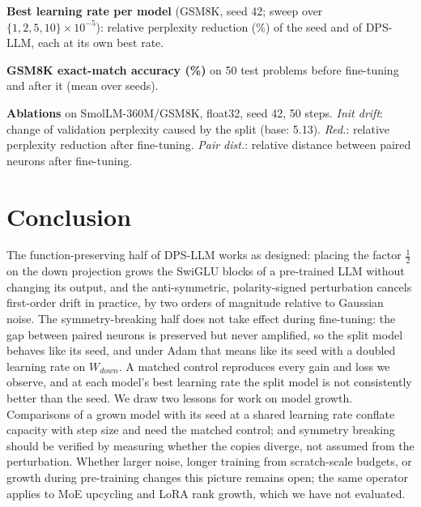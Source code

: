 \begin{table}[t]
\centering
\footnotesize
\setlength{\tabcolsep}{4pt}
\caption{\textbf{Best learning rate per model} (GSM8K, seed 42; sweep over $\{1,2,5,10\}\times10^{-5}$): relative perplexity reduction (\%) of the seed and of DPS-LLM, each at its own best rate.}
\label{tab:lr}
\begin{adjustbox}{max width=\columnwidth}\end{adjustbox}
\end{table}

\begin{table}[t]
\centering
\footnotesize
\setlength{\tabcolsep}{4pt}
\caption{\textbf{GSM8K exact-match accuracy (\%)} on 50 test problems before fine-tuning and after it (mean over seeds).}
\label{tab:accuracy}
\begin{adjustbox}{max width=\columnwidth}\end{adjustbox}
\end{table}

\begin{table}[t]
\centering
\footnotesize
\setlength{\tabcolsep}{3pt}
\caption{\textbf{Ablations} on SmolLM-360M/GSM8K, float32, seed 42, 50 steps. \emph{Init drift}: change of validation perplexity caused by the split (base: 5.13). \emph{Red.}: relative perplexity reduction after fine-tuning. \emph{Pair dist.}: relative distance between paired neurons after fine-tuning.}
\label{tab:ablation}
\begin{adjustbox}{max width=\columnwidth}\end{adjustbox}
\end{table}

\section{Conclusion}
The function-preserving half of DPS-LLM works as designed: placing the factor $\tfrac{1}{2}$ on the down projection grows the SwiGLU blocks of a pre-trained LLM without changing its output, and the anti-symmetric, polarity-signed perturbation cancels first-order drift in practice, by two orders of magnitude relative to Gaussian noise. The symmetry-breaking half does not take effect during fine-tuning: the gap between paired neurons is preserved but never amplified, so the split model behaves like its seed, and under Adam that means like its seed with a doubled learning rate on $W_{down}$. A matched control reproduces every gain and loss we observe, and at each model's best learning rate the split model is not consistently better than the seed. We draw two lessons for work on model growth. Comparisons of a grown model with its seed at a shared learning rate conflate capacity with step size and need the matched control; and symmetry breaking should be verified by measuring whether the copies diverge, not assumed from the perturbation. Whether larger noise, longer training from scratch-scale budgets, or growth during pre-training changes this picture remains open; the same operator applies to MoE upcycling and LoRA rank growth, which we have not evaluated.


